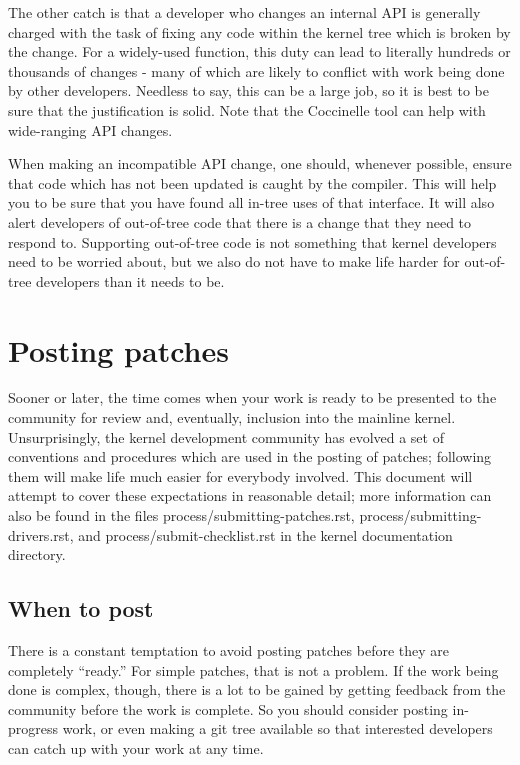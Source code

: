\documentclass[a4paper,8pt,english]{sphinxmanual}
\begin{document}
The other catch is that a developer who changes an internal API is
generally charged with the task of fixing any code within the kernel tree
which is broken by the change.  For a widely-used function, this duty can
lead to literally hundreds or thousands of changes - many of which are
likely to conflict with work being done by other developers.  Needless to
say, this can be a large job, so it is best to be sure that the
justification is solid.  Note that the Coccinelle tool can help with
wide-ranging API changes.

When making an incompatible API change, one should, whenever possible,
ensure that code which has not been updated is caught by the compiler.
This will help you to be sure that you have found all in-tree uses of that
interface.  It will also alert developers of out-of-tree code that there is
a change that they need to respond to.  Supporting out-of-tree code is not
something that kernel developers need to be worried about, but we also do
not have to make life harder for out-of-tree developers than it needs to
be.


\section{Posting patches}
\label{process/5.Posting:posting-patches}\label{process/5.Posting::doc}\label{process/5.Posting:development-posting}
Sooner or later, the time comes when your work is ready to be presented to
the community for review and, eventually, inclusion into the mainline
kernel.  Unsurprisingly, the kernel development community has evolved a set
of conventions and procedures which are used in the posting of patches;
following them will make life much easier for everybody involved.  This
document will attempt to cover these expectations in reasonable detail;
more information can also be found in the files process/submitting-patches.rst,
process/submitting-drivers.rst, and process/submit-checklist.rst in the kernel documentation
directory.


\subsection{When to post}
\label{process/5.Posting:when-to-post}
There is a constant temptation to avoid posting patches before they are
completely ``ready.''  For simple patches, that is not a problem.  If the
work being done is complex, though, there is a lot to be gained by getting
feedback from the community before the work is complete.  So you should
consider posting in-progress work, or even making a git tree available so
that interested developers can catch up with your work at any time.
\end{document}

